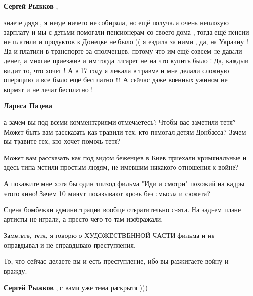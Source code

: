 \begin{itemize}
\begin{itemize}
\textbf{Сергей Рыжков} , 

знаете дядя , я негде ничего не собирала, но ещё
получала очень неплохую зарплату и мы с детьми помогали пенсионерам со своего
дома , тогда ещё пенсии не платили и продуктов в Донецке не было (( я ездила за
ними , да, на Украину ! Да и платили в транспорте за ополченцев, потому что им
ещё совсем не давали денег, а многие приезжие и им тогда сигарет не на что
купить было ! Да, каждый видит то, что хочет ! А в 17 году я лежала в травме и
мне делали сложную операцию и все было ещё бесплатно !!! А сейчас даже военных
ужином не кормят и не лечат бесплатно !

 
\textbf{Лариса Пацева} 

а зачем вы под всеми комментариями отмечаетесь? Чтобы вас заметили тетя? Может
быть вам рассказать как травили тех. кто помогал детям Донбасса? Зачем вы
травите тех, кто хочет помочь тетя?

Может вам рассказать как под видом беженцев в Киев приехали криминальные и
здесь типа мстили простым людям, не имевшим никакого отношения к войне?

А покажите мне хотя бы один эпизод фильма "Иди и смотри" похожий на кадры этого
кино! Зачем 10 минут показывают кровь без смысла и сюжета?

Сцена бомбежки администрации вообще отвратительно снята. На заднем плане
артисты не играли, а просто чего то там изображали.

Заметьте, тетя, я говорю о ХУДОЖЕСТВЕННОЙ ЧАСТИ фильма и не оправдывал и не
оправдываю преступления.

То, что сейчас делаете вы и есть преступление, ибо вы разжигаете войну и
вражду.

 
\textbf{Сергей Рыжков} , с вами уже тема раскрыта )))

 


\end{itemize}
\end{itemize}
